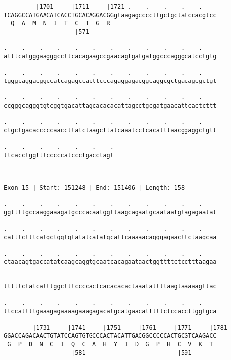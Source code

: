 \documentclass{article}
\begin{document}
\begin{Verbatim}
         |1701     |1711     |1721 .    .    .    .    .    
TCAGGCCATGAACATCACCTGCACAGGACGGgtaagagccccttgctgctatccacgtcc
  Q  A  M  N  I  T  C  T  G  R                              
                    |571                                    
  
.    .    .    .    .    .    .    .    .    .    .    .    
atttcatgggaagggccttcacagaagccgaacagtgatgatggcccagggcatcctgtg
                                                            
.    .    .    .    .    .    .    .    .    .    .    .    
tgggcaggacggccatcagagccacttcccagaggagacggcaggcgctgacagcgctgt
                                                            
.    .    .    .    .    .    .    .    .    .    .    .    
ccgggcagggtgtcggtgacattagcacacacattagcctgcgatgaacattcactcttt
                                                            
.    .    .    .    .    .    .    .    .    .    .    .    
ctgctgacacccccaaccttatctaagcttatcaaatcctcacatttaacggaggctgtt
                                                            
.    .    .    .    .    .    .
ttcacctggtttcccccatccctgacctagt
                               
                               
 
Exon 15 | Start: 151248 | End: 151406 | Length: 158
 
.    .    .    .    .    .    .    .    .    .    .    .    
ggttttgccaaggaaagatgcccacaatggttaagcagaatgcaataatgtagagaatat
                                                            
.    .    .    .    .    .    .    .    .    .    .    .    
catttctttcatgctggtgtatatcatatgcattcaaaaacagggagaacttctaagcaa
                                                            
.    .    .    .    .    .    .    .    .    .    .    .    
ctaacagtgaccatatcaagcaggtgcaatcacagaataactggttttctcctttaagaa
                                                            
.    .    .    .    .    .    .    .    .    .    .    .    
tttttctatcatttggctttccccactcacacacactaaatattttaagtaaaaagttac
                                                            
.    .    .    .    .    .    .    .    .    .    .    .    
ttccattttgaaagagaaaagaaagagacatgcatgaacatttttctccaccttggtgca
                                                            
        |1731     |1741     |1751     |1761     |1771     |1781
GGACCAGACAACTGTATCCAGTGTGCCCACTACATTGACGGCCCCCACTGCGTCAAGACC
 G  P  D  N  C  I  Q  C  A  H  Y  I  D  G  P  H  C  V  K  T 
                   |581                          |591       
  

\end{Verbatim}
\end{document}
